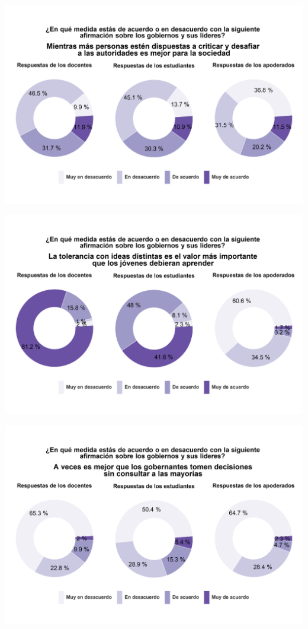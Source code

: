 \documentclass[
  14pt,
]{book}
\begin{document}
\begin{center}\includegraphics[width=52.49in]{images/graph_aut2} \end{center}

\begin{center}\includegraphics[width=52.49in]{images/graph_aut3} \end{center}

\begin{center}\includegraphics[width=52.49in]{images/graph_aut4} \end{center}
\end{document}
